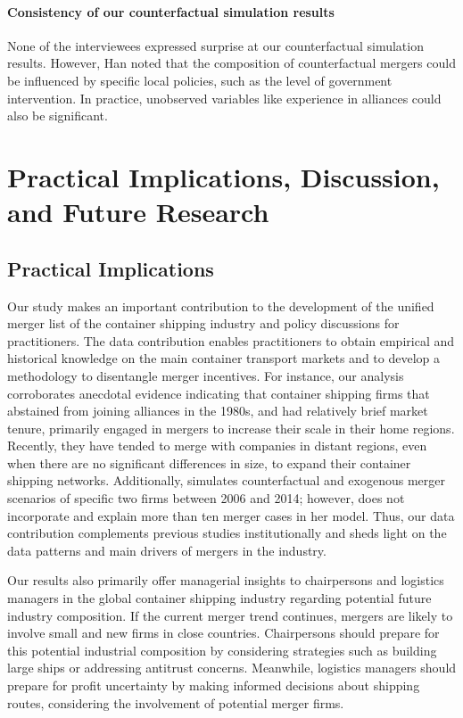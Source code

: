 \documentclass[10pt]{article}
\begin{document}
\paragraph{Consistency of our counterfactual simulation results}
None of the interviewees expressed surprise at our counterfactual simulation results. 
However, Han noted that the composition of counterfactual mergers could be influenced by specific local policies, such as the level of government intervention. 
In practice, unobserved variables like experience in alliances could also be significant.

\section{Practical Implications, Discussion, and Future Research}\label{sec:practical_implications}

\subsection{Practical Implications}

Our study makes an important contribution to the development of the unified merger list of the container shipping industry and policy discussions for practitioners. 
The data contribution enables practitioners to obtain empirical and historical knowledge on the main container transport markets and to develop a methodology to disentangle merger incentives.
For instance, our analysis corroborates anecdotal evidence indicating that container shipping firms that abstained from joining alliances in the 1980s, and had relatively brief market tenure, primarily engaged in mergers to increase their scale in their home regions. 
Recently, they have tended to merge with companies in distant regions, even when there are no significant differences in size, to expand their container shipping networks.
Additionally, \cite{jeon2022learning} simulates counterfactual and exogenous merger scenarios of specific two firms between 2006 and 2014; however, does not incorporate and explain more than ten merger cases in her model.
Thus, our data contribution complements previous studies institutionally and sheds light on the data patterns and main drivers of mergers in the industry.

Our results also primarily offer managerial insights to chairpersons and logistics managers in the global container shipping industry regarding potential future industry composition. If the current merger trend continues, mergers are likely to involve small and new firms in close countries. Chairpersons should prepare for this potential industrial composition by considering strategies such as building large ships or addressing antitrust concerns. Meanwhile, logistics managers should prepare for profit uncertainty by making informed decisions about shipping routes, considering the involvement of potential merger firms.
\end{document}
